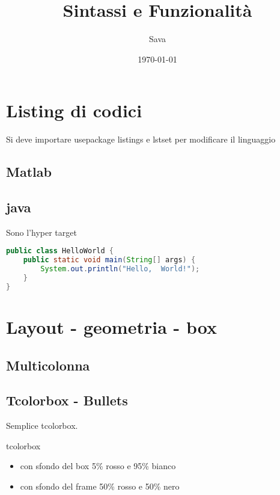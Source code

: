\documentclass[12pt, a4paper]{article}
\title{Sintassi e Funzionalità}
\author{Sava}
\date{\today}
\begin{document}
	\maketitle
	\tableofcontents 
	\listoffigures
	\listoftables
	
	
	\newpage	
	\section{Listing di codici}
	Si deve importare usepackage {listings}
	e lstset{} per modificare il linguaggio
	\subsection{Matlab}
	
	\subsection{java}
	\hypertarget{Sava target}{Sono l'hyper target}
	\begin{lstlisting}[language=Java]
public class HelloWorld {
	public static void main(String[] args) {
		System.out.println("Hello,  World!");
	}
}
	\end{lstlisting}	
	
	
	
	\newpage
	\section{Layout - geometria - box}
	\subsection{Multicolonna}	
	
	
	\subsection{Tcolorbox - Bullets}
	\begin{tcolorbox}
		Semplice tcolorbox.
	\end{tcolorbox}
	\begin{tcolorbox}[colback=red!5!white,colframe=red!50!black,title=Tcolorbox speciale]
		tcolorbox
		\begin{itemize}[noitemsep,topsep=0pt]
			\item con sfondo del box 5\% rosso e 95\% bianco
			\item con sfondo del frame 50\% rosso e 50\% nero
		\end{itemize}
	\end{tcolorbox}
	
\end{document}
